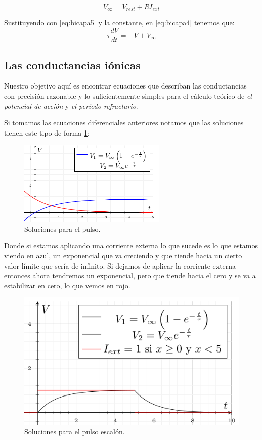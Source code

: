 \begin{equation}
 V_{\infty} = V_{rest} + RI_{ext}
 \label{eq:bicapa5}
\end{equation}

Sustituyendo con \ref{eq:bicapa5} y la constante, en \ref{eq:bicapa4} tenemos que:
\begin{equation}
 \tau\dfrac{dV}{dt} = -V + V_{\infty}
 \label{eq:bicapa6}
\end{equation}

\subsection{Las conductancias iónicas}
Nuestro objetivo aquí es encontrar ecuaciones que describan las conductancias con precisión razonable y lo suficientemente simples para el cálculo teórico de \emph{el potencial de acción} y \emph{el período refractario}. 

Si tomamos las ecuaciones diferenciales anteriores notamos que las soluciones tienen este tipo de forma \ref{fig:graficaX}:

\begin{figure}[h]
 \centering
 \includegraphics[scale=0.8]{../Figuras/solPulso1.png}
 \caption{Soluciones para el pulso.}
 \label{fig:graficaX}
\end{figure}


Donde si estamos aplicando una corriente externa lo que sucede es lo que estamos viendo en azul, un exponencial que va creciendo y que tiende hacia un cierto valor límite que sería de infinito. Si dejamos de aplicar la corriente externa entonces ahora tendremos un exponencial, pero que tiende hacia el cero y se va a estabilizar en cero, lo que vemos en rojo. 

\begin{figure}[h]
 \centering
 \includegraphics[scale=0.5]{../Figuras/solPulso2.png}
 \caption{Soluciones para el pulso escalón.}
 \label{fig:graficaX1}
\end{figure}

